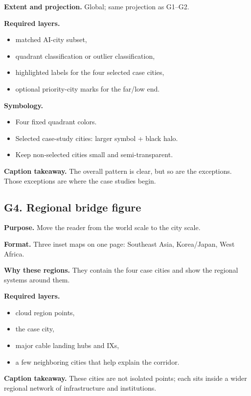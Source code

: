 \documentclass[11pt]{article}
\begin{document}
\textbf{Extent and projection.} Global; same projection as G1--G2.

\textbf{Required layers.}
\begin{itemize}[leftmargin=1.4em,itemsep=0.2em]
    \item matched AI-city subset,
    \item quadrant classification or outlier classification,
    \item highlighted labels for the four selected case cities,
    \item optional priority-city marks for the far/low end.
\end{itemize}

\textbf{Symbology.}
\begin{itemize}[leftmargin=1.4em,itemsep=0.2em]
    \item Four fixed quadrant colors.
    \item Selected case-study cities: larger symbol + black halo.
    \item Keep non-selected cities small and semi-transparent.
\end{itemize}

\textbf{Caption takeaway.} The overall pattern is clear, but so are the exceptions. Those exceptions are where the case studies begin.

\subsection{G4. Regional bridge figure}
\textbf{Purpose.} Move the reader from the world scale to the city scale.

\textbf{Format.} Three inset maps on one page: Southeast Asia, Korea/Japan, West Africa.

\textbf{Why these regions.} They contain the four case cities and show the regional systems around them.

\textbf{Required layers.}
\begin{itemize}[leftmargin=1.4em,itemsep=0.2em]
    \item cloud region points,
    \item the case city,
    \item major cable landing hubs and IXs,
    \item a few neighboring cities that help explain the corridor.
\end{itemize}

\textbf{Caption takeaway.} These cities are not isolated points; each sits inside a wider regional network of infrastructure and institutions.
\end{document}
